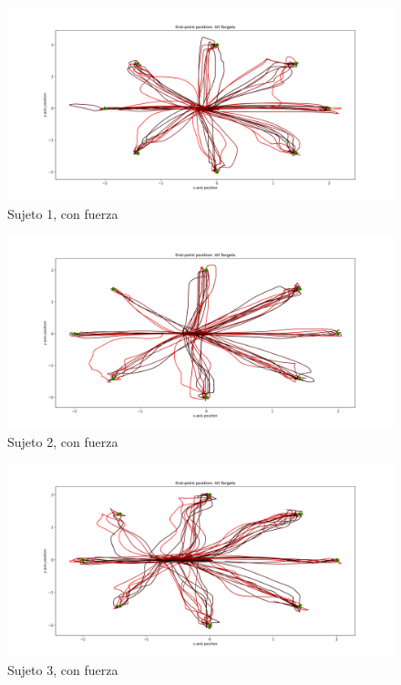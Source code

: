 \documentclass[a4paper,11pt, oneside]{book}
\begin{document}
\begin{figure}[H]
	\includegraphics[width=\linewidth]{sujeto1/force/trayectorias}
	\caption{Sujeto 1, con fuerza}
	\label{1-2-0}
\end{figure}
\begin{figure}[H]
	\includegraphics[width=\linewidth]{sujeto2/force/trayectorias}
	\caption{Sujeto 2, con fuerza}
	\label{2-2-0}
\end{figure}
\begin{figure}[H]
	\includegraphics[width=\linewidth]{sujeto3/force/trayectorias}
	\caption{Sujeto 3, con fuerza}
	\label{3-2-0}
\end{figure}
\end{document}
